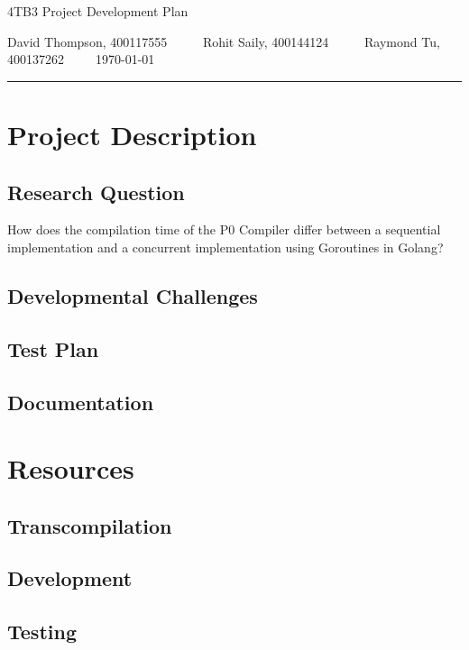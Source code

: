\documentclass{article}
\author{Rohit Saily, David Thompson, Raymond Tu}
\date{\today}
\title{\mytitle}
\newcommand{\mytitle}{4TB3 Project Development Plan}
\begin{document}
{\sffamily
{\huge \mytitle}

\medskip

David Thompson, 400117555~~~~~
Rohit Saily, 400144124~~~~~
Raymond Tu, 400137262~~~~~\today
}

\par\noindent\rule{\textwidth}{0.4pt}
\bigskip

\section{Project Description}

\subsection{Research Question}

How does the compilation time of the P0 Compiler differ between a sequential implementation and a concurrent implementation using Goroutines in Golang?  

\subsection{Developmental Challenges} %

\subsection{Test Plan} %

\subsection{Documentation} %

\section{Resources}

\subsection{Transcompilation} %

\subsection{Development} %

\subsection{Testing} %
\end{document}

